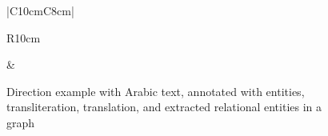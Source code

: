 \begin{figure}[tb]
\begin{center}
{\begin{tabular}{|C{10cm}C{8cm}|}
\begin{tabular}{R{10cm}}
  \end{tabular}
&
\resizebox{0.6\columnwidth}{!}{
  }
\\  \hline
    \end{tabular}
}
\end{center}
\vspace{-1em} 
  \caption{Direction example with Arabic text, annotated with entities, transliteration, translation, and extracted relational entities in a graph} 
  \label{fig:intromotiv}
\vspace{-1em} 
\end{figure}
\transtrue
{}
